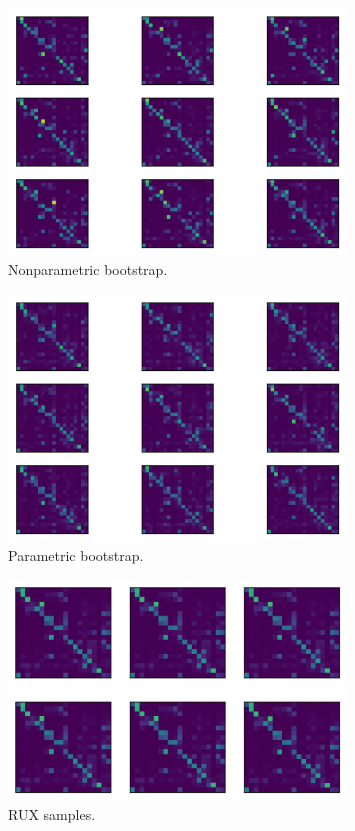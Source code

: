 \begin{figure}
\includegraphics[width=0.8\textwidth]{../images/nonparametricbootstrap}
\caption{Nonparametric bootstrap.\label{fig:nonparametricbootstrap}}
\end{figure}

\begin{figure}
\includegraphics[width=0.8\textwidth]{../images/parametricbootstrap}
\caption{Parametric bootstrap.\label{fig:parametricbootstrap}}
\end{figure}

\begin{figure}
\includegraphics[width=0.8\textwidth]{../images/unif}
\caption{RUX samples.\label{fig:ruxsamples}}
\end{figure}

